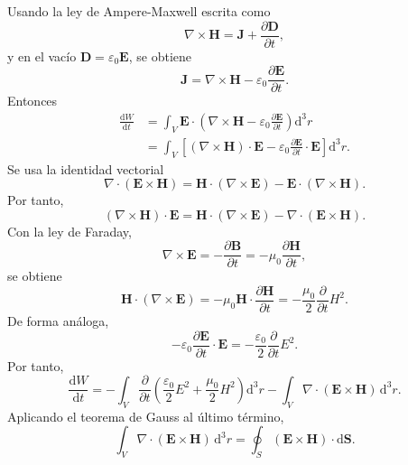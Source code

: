 \documentclass[11pt]{article}
\newcommand{\dd}{\mathrm{d}}
\newcommand{\vb}[1]{\mathbf{#1}}
\begin{document}
Usando la ley de Ampere-Maxwell escrita como
\begin{equation}
  \nabla\times\vb H
  =
  \vb J+\frac{\partial\vb D}{\partial t},
\end{equation}
y en el vac\'io $\vb D=\varepsilon_0\vb E$, se obtiene
\begin{equation}
  \vb J
  =
  \nabla\times\vb H
  -
  \varepsilon_0\frac{\partial\vb E}{\partial t}.
\end{equation}
Entonces
\begin{align}
  \frac{\dd W}{\dd t}
  &=
  \int_V
  \vb E\cdot
  \left(
  \nabla\times\vb H
  -
  \varepsilon_0\frac{\partial\vb E}{\partial t}
  \right)
  \dd^3r\\
  &=
  \int_V
  \left[
  (\nabla\times\vb H)\cdot\vb E
  -
  \varepsilon_0
  \frac{\partial\vb E}{\partial t}\cdot\vb E
  \right]\dd^3r.
\end{align}
Se usa la identidad vectorial
\begin{equation}
  \nabla\cdot(\vb E\times\vb H)
  =
  \vb H\cdot(\nabla\times\vb E)
  -
  \vb E\cdot(\nabla\times\vb H).
\end{equation}
Por tanto,
\begin{equation}
  (\nabla\times\vb H)\cdot\vb E
  =
  \vb H\cdot(\nabla\times\vb E)
  -
  \nabla\cdot(\vb E\times\vb H).
\end{equation}
Con la ley de Faraday,
\begin{equation}
  \nabla\times\vb E
  =
  -\frac{\partial\vb B}{\partial t}
  =
  -\mu_0\frac{\partial\vb H}{\partial t},
\end{equation}
se obtiene
\begin{equation}
  \vb H\cdot(\nabla\times\vb E)
  =
  -\mu_0\vb H\cdot\frac{\partial\vb H}{\partial t}
  =
  -\frac{\mu_0}{2}
  \frac{\partial}{\partial t}H^2.
\end{equation}
De forma an\'aloga,
\begin{equation}
  -\varepsilon_0
  \frac{\partial\vb E}{\partial t}\cdot\vb E
  =
  -\frac{\varepsilon_0}{2}
  \frac{\partial}{\partial t}E^2.
\end{equation}
Por tanto,
\begin{equation}
  \frac{\dd W}{\dd t}
  =
  -\int_V
  \frac{\partial}{\partial t}
  \left(
  \frac{\varepsilon_0}{2}E^2
  +
  \frac{\mu_0}{2}H^2
  \right)\dd^3r
  -
  \int_V\nabla\cdot(\vb E\times\vb H)\,\dd^3r.
\end{equation}
Aplicando el teorema de Gauss al \'ultimo t\'ermino,
\begin{equation}
  \int_V\nabla\cdot(\vb E\times\vb H)\,\dd^3r
  =
  \oint_S(\vb E\times\vb H)\cdot\dd\vb S.
\end{equation}
\end{document}
